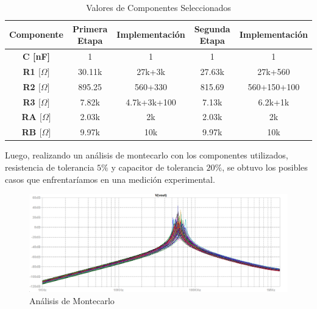 \begin{table}[H]
\centering
\begin{tabular}{@{}ccccc@{}}
\toprule
\textbf{Componente}                     & \textbf{Primera Etapa} & \textbf{Implementación} & \textbf{Segunda Etapa} & \textbf{Implementación} \\ \midrule
\textbf{C {[}nF{]}}                     & 1                      & 1                       & 1                      & 1                       \\
\textbf{R1 ${[}\Omega{]}$} & 30.11k                 & 27k+3k                  & 27.63k                 & 27k+560                 \\
\textbf{R2 ${[}\Omega{]}$} & 895.25                 & 560+330                 & 815.69                 & 560+150+100             \\
\textbf{R3 ${[}\Omega{]}$} & 7.82k                  & 4.7k+3k+100             & 7.13k                  & 6.2k+1k                 \\
\textbf{RA ${[}\Omega{]}$} & 2.03k                  & 2k                      & 2.03k                  & 2k                      \\
\textbf{RB ${[}\Omega{]}$} & 9.97k                  & 10k                     & 9.97k                  & 10k                     \\ \bottomrule
\end{tabular}
\label{ej22tvalr}
\caption{Valores de Componentes Seleccionados}
\end{table}

Luego, realizando un análisis de montecarlo con los componentes utilizados, resistencia de tolerancia $5\%$ y capacitor de tolerancia $20\%$, se obtuvo los posibles casos que enfrentaríamos en una medición experimental.

\begin{figure}[H]
    \centering
    \includegraphics[scale = 0.65]{monte.PNG}
    \caption{Análisis de Montecarlo}
    \label{ej22monteall}
\end{figure}

